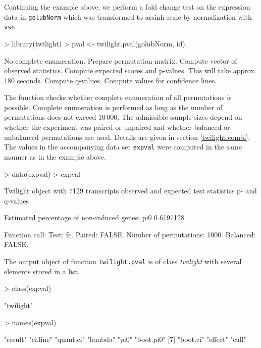\documentclass[11pt,a4paper,fleqn]{report}
\newcommand{\Robject}[1]{{\texttt{#1}}}
\newcommand{\Rfunction}[1]{{\texttt{#1}}}
\newcommand{\Rclass}[1]{{\textit{#1}}}
\begin{document}
Continuing the example above, we perform a fold change test on the expression data in \Robject{golubNorm} which was transformed to arsinh scale by normalization with \Rfunction{vsn}.
\begin{Schunk}
\begin{Sinput}
> library(twilight)
> pval <- twilight.pval(golubNorm, id)
\end{Sinput}
\begin{Soutput}
No complete enumeration. Prepare permutation matrix. 
Compute vector of observed statistics. 
Compute expected scores and p-values. This will take approx. 180 seconds. 
Compute q-values. 
Compute values for confidence lines. 
\end{Soutput}
\end{Schunk}

The function checks whether complete enumeration of all permutations is possible. Complete enumeration is performed as long as the number of permutations does not exceed 10\,000. The admissible sample sizes depend on whether the experiment was paired or unpaired and whether balanced or unbalanced permutations are used. Details are given in section \ref{twilight.combi}.
The values in the accompanying data set \Robject{expval} were computed in the same manner as in the example above.
\begin{Schunk}
\begin{Sinput}
> data(expval)
> expval
\end{Sinput}
\begin{Soutput}
 Twilight object with
     7129 transcripts
     observed and expected test statistics
     p- and q-values

 Estimated percentage of non-induced genes:
      pi0 
0.6197128 

 Function call:
 Test: fc. Paired: FALSE. Number of permutations: 1000. Balanced: FALSE. 
\end{Soutput}
\end{Schunk}

The output object of function \Rfunction{twilight.pval} is of class \Rclass{twilight} with several elements stored in a list.
\begin{Schunk}
\begin{Sinput}
> class(expval)
\end{Sinput}
\begin{Soutput}
[1] "twilight"
\end{Soutput}
\begin{Sinput}
> names(expval)
\end{Sinput}
\begin{Soutput}
[1] "result"   "ci.line"  "quant.ci" "lambda"   "pi0"      "boot.pi0"
[7] "boot.ci"  "effect"   "call"    
\end{Soutput}
\end{Schunk}
\end{document}

